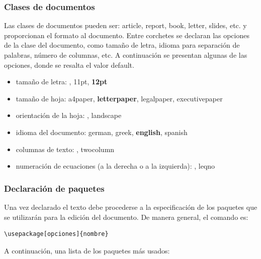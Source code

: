 \documentclass[12pt]{report}
\begin{document}
\subsubsection*{Clases de documentos}
\noindent Las clases de documentos pueden ser: {\sf article, report, book, letter, slides}, etc. y proporcionan el formato al documento. Entre corchetes se declaran las opciones de la clase del documento, como tamaño de letra, idioma para separación de palabras, número de columnas, etc. A continuación se presentan algunas de las opciones, donde se resalta el valor default.

\begin{itemize}
\item tamaño de letra: {\sffamily 10pt, 11pt, {\bfseries 12pt}}
\item tamaño de hoja: {\sffamily a4paper, {\bfseries letterpaper}, legalpaper, executivepaper}
\item orientación de la hoja: {, landscape}
\item idioma del documento: {\sffamily german, greek, {\bfseries english}, spanish}
\item columnas de texto: {, twocolumn}
\item numeración de ecuaciones (a la derecha o a la izquierda): {, leqno} 
\end{itemize}

\subsubsection*{Declaración de paquetes}
\noindent Una vez declarado el texto debe procederse a la especificación de los paquetes que se utilizarán para la edición del documento. De manera general, el comando es:
\begin{verbatim}
\usepackage[opciones]{nombre}
\end{verbatim}

A continuación, una lista de los paquetes más usados:
\end{document}
